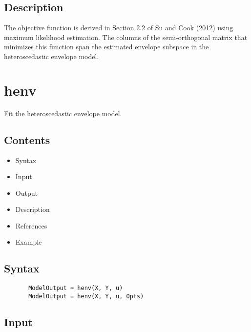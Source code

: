 \documentclass[a4paper,11pt,openany]{memoir}
\begin{document}
\subsection*{Description}

\begin{par}
The objective function is derived in Section 2.2 of Su and Cook (2012)  using maximum likelihood estimation. The columns of the semi-orthogonal matrix that minimizes this function span the estimated envelope subspace in the heteroscedastic envelope model.
\end{par} \vspace{1em}
\newpage


    
\rmfamily
\color{black}\section{henv}

\begin{par}
Fit the heteroscedastic envelope model.
\end{par} \vspace{1em}

\subsection*{Contents}

\begin{itemize}
\setlength{\itemsep}{-1ex}
   \item Syntax
   \item Input
   \item Output
   \item Description
   \item References
   \item Example
\end{itemize}


\subsection*{Syntax}


\begin{verbatim}       ModelOutput = henv(X, Y, u)
       ModelOutput = henv(X, Y, u, Opts)\end{verbatim}
    

\subsection*{Input}
\end{document}
